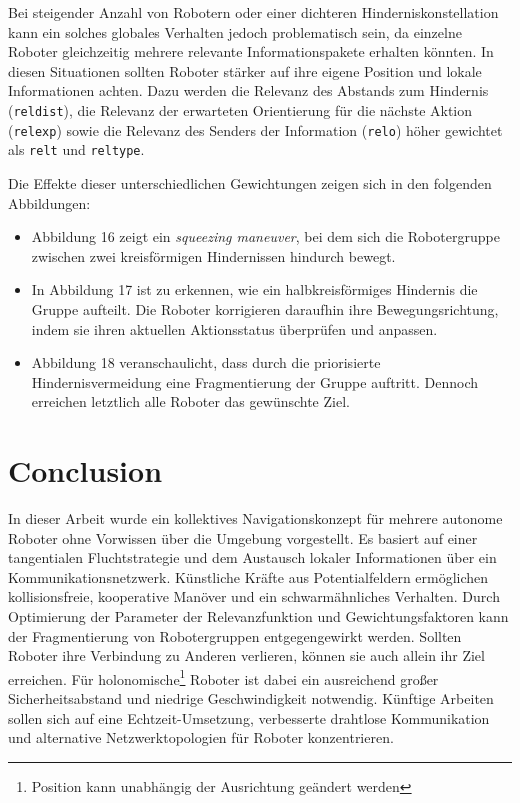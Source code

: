 \documentclass[conference]{IEEEtran}
\begin{document}
Bei steigender Anzahl von Robotern oder einer dichteren Hinderniskonstellation 
kann ein solches globales Verhalten jedoch problematisch sein, da einzelne 
Roboter gleichzeitig mehrere relevante Informationspakete erhalten könnten. 
In diesen Situationen sollten Roboter stärker auf ihre eigene Position und lokale 
Informationen achten. Dazu werden die Relevanz des Abstands zum Hindernis 
(\texttt{reldist}), die Relevanz der erwarteten Orientierung für die nächste Aktion 
(\texttt{relexp}) sowie die Relevanz des Senders der Information (\texttt{relo}) 
höher gewichtet als \texttt{relt} und \texttt{reltype}.

Die Effekte dieser unterschiedlichen Gewichtungen zeigen sich in den folgenden Abbildungen:
\begin{itemize}
\item Abbildung 16 zeigt ein \textit{squeezing maneuver}, bei dem sich die Robotergruppe zwischen zwei kreisförmigen Hindernissen hindurch bewegt.
\item In Abbildung 17 ist zu erkennen, wie ein halbkreisförmiges Hindernis die Gruppe aufteilt. Die Roboter korrigieren daraufhin ihre Bewegungsrichtung, indem sie ihren aktuellen Aktionsstatus überprüfen und anpassen.
\item Abbildung 18 veranschaulicht, dass durch die priorisierte Hindernisvermeidung eine Fragmentierung der Gruppe auftritt. Dennoch erreichen letztlich alle Roboter das gewünschte Ziel.
\end{itemize}


\section{Conclusion}
In dieser Arbeit wurde ein kollektives Navigationskonzept für mehrere autonome 
Roboter ohne Vorwissen über die Umgebung vorgestellt. Es basiert auf 
einer tangentialen Fluchtstrategie und dem Austausch lokaler Informationen über 
ein Kommunikationsnetzwerk. Künstliche Kräfte aus Potentialfeldern ermöglichen 
kollisionsfreie, kooperative Manöver und ein schwarmähnliches Verhalten. Durch 
Optimierung der Parameter der Relevanzfunktion und Gewichtungsfaktoren kann der 
Fragmentierung von Robotergruppen entgegengewirkt werden. Sollten Roboter ihre Verbindung zu Anderen verlieren,
können sie auch allein ihr Ziel erreichen. Für holonomische\footnote{Position kann unabhängig der Ausrichtung geändert werden} Roboter ist dabei ein 
ausreichend großer Sicherheitsabstand und niedrige Geschwindigkeit notwendig. 
Künftige Arbeiten sollen sich auf eine Echtzeit-Umsetzung, verbesserte drahtlose 
Kommunikation und alternative Netzwerktopologien für Roboter konzentrieren.




\end{document}

